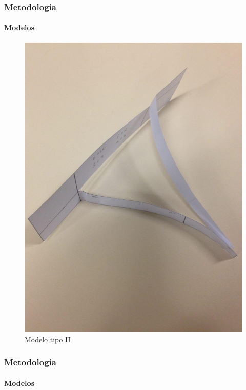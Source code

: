 \documentclass{beamer}
\begin{document}
    \begin{frame}
        \frametitle{Metodologia}
            \framesubtitle{Modelos}
        \begin{figure}
            \label{fig:modelo tipo 2}
            \includegraphics[scale=0.1]{foto02}
            \caption{Modelo tipo II}
        \end{figure}
    \end{frame}
    \begin{frame}
        \frametitle{Metodologia}
            \framesubtitle{Modelos}
        \begin{figure}
        \end{figure}
    \end{frame}
\end{document}
